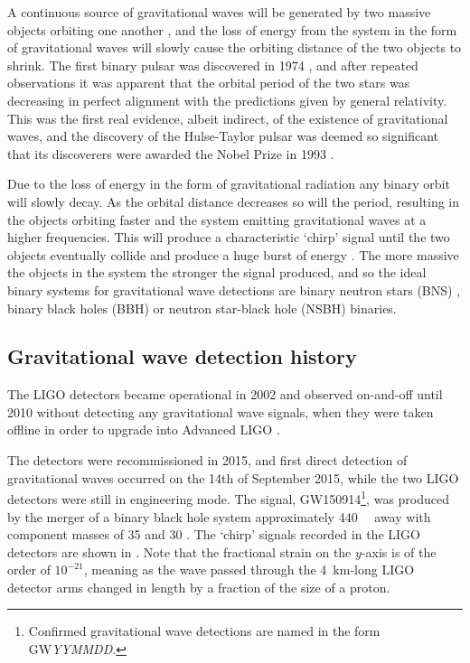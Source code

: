 \begin{colsection}
\begin{colsection}
A continuous source of gravitational waves will be generated by two massive objects orbiting one another \citep{GW_sources}, and the loss of energy from the system in the form of gravitational waves will slowly cause the orbiting distance of the two objects to shrink. The first binary pulsar was discovered in 1974 \citep{HulseTaylor}, and after repeated observations it was apparent that the orbital period of the two stars was decreasing in perfect alignment with the predictions given by general relativity. This was the first real evidence, albeit indirect, of the existence of gravitational waves, and the discovery of the Hulse-Taylor pulsar was deemed so significant that its discoverers were awarded the Nobel Prize in 1993 \citep{HulseTaylor2}.

Due to the loss of energy in the form of gravitational radiation any binary orbit will slowly decay. As the orbital distance decreases so will the period, resulting in the objects orbiting faster and the system emitting gravitational waves at a higher frequencies. This will produce a characteristic `chirp' signal until the two objects eventually collide and produce a huge burst of energy \citep{GW_sources, BIGparis}. The more massive the objects in the system the stronger the signal produced, and so the ideal binary systems for gravitational wave detections are binary neutron stars (BNS) , binary black holes (BBH)  or neutron star-black hole (NSBH)  binaries.

\end{colsection}


\subsection{Gravitational wave detection history}
\label{sec:gw_detections}
\begin{colsection}

The LIGO detectors became operational in 2002 and observed on-and-off until 2010 without detecting any gravitational wave signals, when they were taken offline in order to upgrade into Advanced LIGO \citep{LIGO_initial, LIGO_advanced}.

The detectors were recommissioned in 2015, and first direct detection of gravitational waves occurred on the 14th of September 2015, while the two LIGO detectors were still in engineering mode. The signal, GW150914\footnote{Confirmed gravitational wave detections are named in the form GW\textit{YYMMDD}.}, was produced by the merger of a binary black hole system approximately \SI{440}{\mega\parsec} away with component masses of \SI{35}{\solarmass} and \SI{30}{\solarmass} \citep{GW150914}. The `chirp' signals recorded in the LIGO detectors are shown in . Note that the fractional strain on the $y$-axis is of the order of $10^{-21}$, meaning as the wave passed through the \SI{4}{\kilo\metre}-long LIGO detector arms changed in length by a fraction of the size of a proton.


\end{colsection}
\end{colsection}
